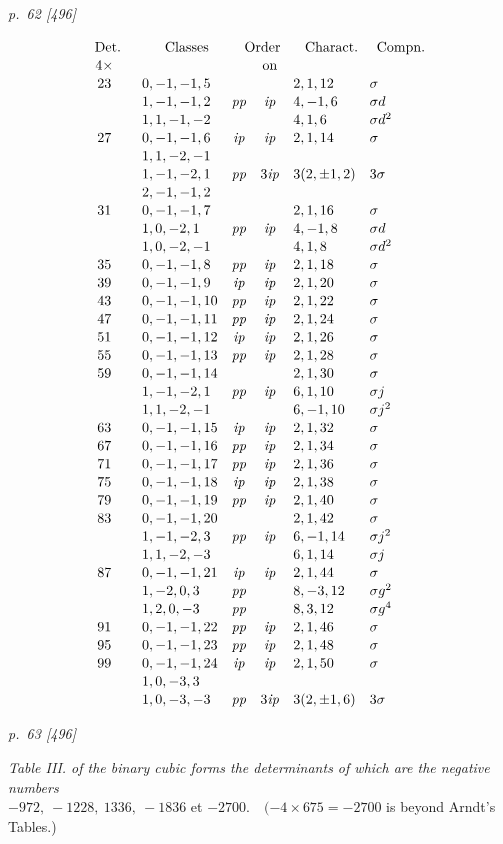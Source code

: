 ﻿\documentclass[11pt,a4paper]{article}
\theoremstyle{plain}
\theoremstyle{definition}
\newcommand{\pp}{\mathit{pp}}
\newcommand{\ip}{\mathit{ip}}
\newcommand{\sg}{\sigma}
\newcommand{\row}[7]{#1 & #2 & #3 & #4 & #5 & #6 & #7\\}
\begin{document}
\textit{p.~62 [496]}

\[
\renewcommand{\arraystretch}{1.08}
\begin{array}{c@{\quad}r@{\quad}l@{\quad}c@{\quad}c@{\quad}l@{\quad}l}
\multicolumn{1}{c}{\text{Det.}}&&
\multicolumn{1}{c}{\text{Classes}}&
\multicolumn{2}{c}{\text{Order}}&
\multicolumn{1}{c}{\text{Charact.}}&
\multicolumn{1}{c}{\text{Compn.}}\\
4\times&&&&\text{on}&&\\
\row{23}{}{0,-1,-1,5}{}{}{2,1,12}{\sg}
\row{}{}{1,-1,-1,2}{\pp}{\ip}{4,-1,6}{\sg d}
\row{}{}{1,1,-1,-2}{}{}{4,1,6}{\sg d^2}
\row{27}{}{0,-1,-1,6}{\ip}{\ip}{2,1,14}{\sg}
\row{}{}{1,1,-2,-1}{}{}{}{}
\row{}{}{1,-1,-2,1}{\pp}{3\ip}{3(2,\pm1,2)}{3\sg}
\row{}{}{2,-1,-1,2}{}{}{}{}
\row{31}{}{0,-1,-1,7}{}{}{2,1,16}{\sg}
\row{}{}{1,0,-2,1}{\pp}{\ip}{4,-1,8}{\sg d}
\row{}{}{1,0,-2,-1}{}{}{4,1,8}{\sg d^2}
\row{35}{}{0,-1,-1,8}{\pp}{\ip}{2,1,18}{\sg}
\row{39}{}{0,-1,-1,9}{\ip}{\ip}{2,1,20}{\sg}
\row{43}{}{0,-1,-1,10}{\pp}{\ip}{2,1,22}{\sg}
\row{47}{}{0,-1,-1,11}{\pp}{\ip}{2,1,24}{\sg}
\row{51}{}{0,-1,-1,12}{\ip}{\ip}{2,1,26}{\sg}
\row{55}{}{0,-1,-1,13}{\pp}{\ip}{2,1,28}{\sg}
\row{59}{}{0,-1,-1,14}{}{}{2,1,30}{\sg}
\row{}{}{1,-1,-2,1}{\pp}{\ip}{6,1,10}{\sg j}
\row{}{}{1,1,-2,-1}{}{}{6,-1,10}{\sg j^2}
\row{63}{}{0,-1,-1,15}{\ip}{\ip}{2,1,32}{\sg}
\row{67}{}{0,-1,-1,16}{\pp}{\ip}{2,1,34}{\sg}
\row{71}{}{0,-1,-1,17}{\pp}{\ip}{2,1,36}{\sg}
\row{75}{}{0,-1,-1,18}{\ip}{\ip}{2,1,38}{\sg}
\row{79}{}{0,-1,-1,19}{\pp}{\ip}{2,1,40}{\sg}
\row{83}{}{0,-1,-1,20}{}{}{2,1,42}{\sg}
\row{}{}{1,-1,-2,3}{\pp}{\ip}{6,-1,14}{\sg j^2}
\row{}{}{1,1,-2,-3}{}{}{6,1,14}{\sg j}
\row{87}{}{0,-1,-1,21}{\ip}{\ip}{2,1,44}{\sg}
\row{}{}{1,-2,0,3}{\pp}{}{8,-3,12}{\sg g^2}
\row{}{}{1,2,0,-3}{\pp}{}{8,3,12}{\sg g^4}
\row{91}{}{0,-1,-1,22}{\pp}{\ip}{2,1,46}{\sg}
\row{95}{}{0,-1,-1,23}{\pp}{\ip}{2,1,48}{\sg}
\row{99}{}{0,-1,-1,24}{\ip}{\ip}{2,1,50}{\sg}
\row{}{}{1,0,-3,3}{}{}{}{}
\row{}{}{1,0,-3,-3}{\pp}{3\ip}{3(2,\pm1,6)}{3\sg}
\end{array}
\]

\clearpage
\textit{p.~63 [496]}

\normalsize
\begin{center}
\textit{Table III. of the binary cubic forms the determinants of which are the negative numbers}\\
\(-972,\ -1228,\ 1336,\ -1836\) et \(-2700.\quad (-4\times675=-2700\) is beyond Arndt's Tables.)
\end{center}
\scriptsize
\end{document}
